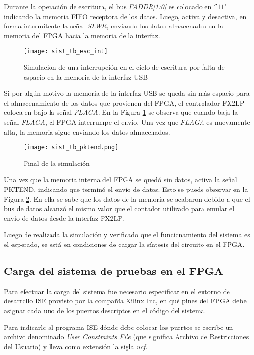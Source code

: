 	Durante la operación de escritura, el bus \textit{FADDR[1:0]} es colocado en $''11'$ indicando la memoria FIFO receptora de los datos. Luego, activa y desactiva, en forma intermitente la señal \textit{SLWR}, enviando los datos almacenados en la memoria del FPGA hacia la memoria de la interfaz.
	
	\begin{figure}[t]
		\centering
		\texttt{[image: sist\_tb\_esc\_int]}
		\caption{Simulación de una interrupción en el ciclo de escritura por falta de espacio en la memoria de la interfaz USB}
		\label{test:tb:int}
	\end{figure}
	
	Si por algún motivo la memoria de la interfaz USB se queda sin más espacio para el almacenamiento de los datos que provienen del FPGA, el controlador FX2LP coloca en bajo la señal \textit{FLAGA}. En la Figura \ref{test:tb:int} se observa que cuando baja la señal \textit{FLAGA}, el FPGA interrumpe el envío. Una vez que \textit{FLAGA} es nuevamente alta, la memoria sigue enviando los datos almacenados.
	
	\begin{figure}[b]
		\centering
		\texttt{[image: sist\_tb\_pktend.png]}
		\caption{Final de la simulación}
		\label{test:tb:pktend}
	\end{figure}

	Una vez que la memoria interna del FPGA se quedó sin datos, activa la señal PKTEND, indicando que terminó el envío de datos. Esto se puede observar en la Figura \ref{test:tb:pktend}. En ella se sabe que los datos de la memoria se acabaron debido a que el bus de datos alcanzó el mismo valor que el contador utilizado para emular el envío de datos desde la interfaz FX2LP.
	
	Luego de realizada la simulación y verificado que el funcionamiento del sistema es el esperado, se está en condiciones de cargar la síntesis del circuito en el FPGA.
	
\subsection{Carga del sistema de pruebas en el FPGA}
	Para efectuar la carga del sistema fue necesario especificar en el entorno de desarrollo ISE provisto por la compañía Xilinx Inc, en qué pines del FPGA debe asignar cada uno de los puertos descriptos en el código del sistema.
	
	Para indicarle al programa ISE dónde debe colocar los puertos se escribe un archivo denominado \textit{User Constraints File} (que significa Archivo de Restricciones del Usuario) y lleva como extensión la sigla \textit{ucf}.
	
